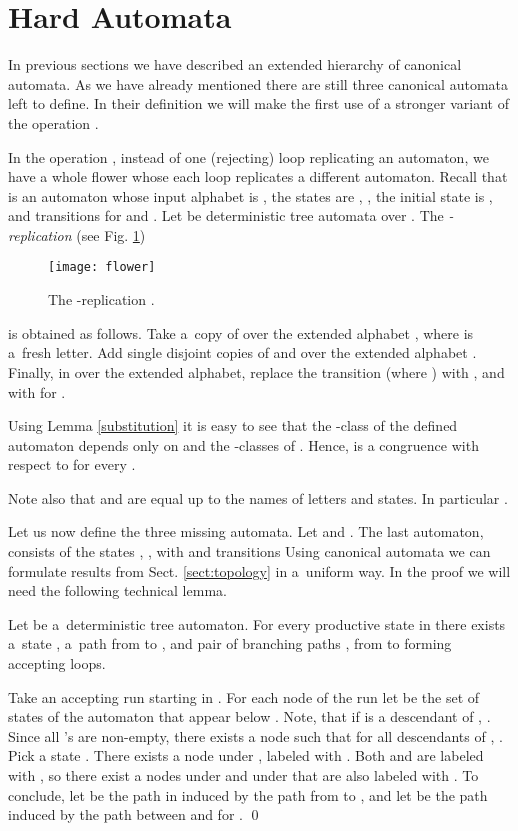 \documentclass{LMCS}
\begin{document}
\section{Hard Automata} \label{wagnerhierarchyandbeyond}

In previous sections we have described an extended hierarchy of
canonical automata. As we have already mentioned there are still three
canonical automata left to define. In their definition we will make
the first use of a stronger variant of the operation .

In the operation ,
instead of one (rejecting) loop replicating an automaton, we have a whole flower whose each
loop replicates a different automaton. Recall that  
is an automaton whose input alphabet is , the states are , , the initial state is ,  and transitions  
for  and . Let  be deterministic tree automata over . The {\em -replication}     (see Fig. \ref{fig:flower}) 
\begin{figure}
\centering
\texttt{[image: flower]}
\caption{The -replication .}
\label{fig:flower}
\end{figure}
is obtained as follows. Take a~copy of  over the
extended alphabet , where  is a~fresh letter. Add single disjoint
copies of   and  over the extended
alphabet . Finally, in  over the extended alphabet,
replace the transition 
(where ) with , and  with    for . 

Using Lemma \ref{substitution} it is easy to see that the
-class of the defined automaton depends only on  and the -classes of . Hence,  is a congruence with respect to
 for every
.  

Note also that  and  
are equal up to the names of letters and states. In particular  
.

Let us now define the three missing automata. Let  and  . The last automaton,  consists of the states , ,  with  and transitions   
Using canonical automata we can formulate results from Sect. \ref{sect:topology} in a~uniform way. In the proof we will need the following technical lemma. 

\begin{lem} \label{embeddingtop}
Let  be a~deterministic tree automaton. For every productive state  in  there exists a~state , a~path  from  to ,  and pair of branching paths ,  from  to  forming accepting loops.
\end{lem}

\proof Take an accepting run starting in . For  each node  of
the run let  be the set of states of the automaton that appear
below . Note, that if  is a descendant of , . Since all 's
are non-empty, there exists a node  such that for all descendants  of
, . Pick a state . There exists a node  under , labeled with . Both
 and  are labeled with , so there exist a nodes 
under  and  under  that are also labeled with . To
conclude, let  be the path in  induced by the path from
 to , and let  be the path induced by the path
between  and  for . \footnotemark[1]  \qed
\end{document}
